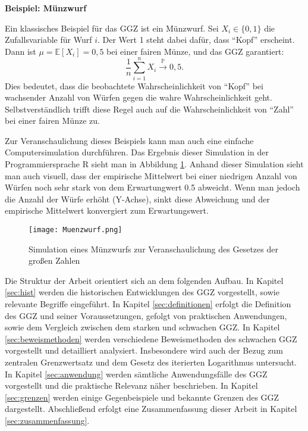 \documentclass[12pt,a4paper]{article}
\begin{document}
\newpage


\textbf{Beispiel: Münzwurf}

Ein klassisches Beispiel für das GGZ ist ein Münzwurf. Sei \( X_i \in \{0,1\} \) die Zufallsvariable für Wurf \( i \). Der Wert 1 steht dabei dafür, dass \enquote{Kopf} erscheint. Dann ist \( \mu = \mathbb{E}[X_i] = 0{,}5 \) bei einer fairen Münze, und das GGZ garantiert:
\[
\frac{1}{n} \sum_{i=1}^n X_i \xrightarrow{\mathbb{P}} 0{,}5.
\]
Dies bedeutet, dass die beobachtete Wahrscheinlichkeit von \enquote{Kopf} bei wachsender Anzahl von Würfen gegen die wahre Wahrscheinlichkeit geht.
Selbstverständlich trifft diese Regel auch auf die Wahrscheinlichkeit von \enquote{Zahl} bei einer fairen Münze zu. 

Zur Veranschaulichung dieses Beispiels kann man auch eine einfache Computersimulation durchführen.
Das Ergebnis dieser Simulation in der Programmiersprache R sieht man in Abbildung \ref{fig:muenzwurf}.
Anhand dieser Simulation sieht man auch visuell, dass der empirische Mittelwert bei einer niedrigen Anzahl von Würfen noch sehr stark von dem Erwartungwert 0.5 abweicht.
Wenn man jedoch die Anzahl der Würfe erhöht (Y-Achse), sinkt diese Abweichung und der empirische Mittelwert konvergiert zum Erwartungswert.


\begin{figure}[h!]
  \centering
  \texttt{[image: Muenzwurf.png]}
  \caption{Simulation eines Münzwurfs zur Veranschaulichung des Gesetzes der großen Zahlen}
  \label{fig:muenzwurf}
\end{figure}

\newpage

Die Struktur der Arbeit orientiert sich an dem folgenden Aufbau.
In Kapitel \ref{sec:hist} werden die historischen Entwicklungen des GGZ vorgestellt, sowie relevante Begriffe eingeführt.
In Kapitel \ref{sec:definitionen} erfolgt die Definition des GGZ und seiner Voraussetzungen, gefolgt von praktischen Anwendungen, sowie dem Vergleich zwischen dem starken und schwachen GGZ.
In Kapitel \ref{sec:beweismethoden} werden verschiedene Beweismethoden des schwachen GGZ vorgestellt und detailliert analysiert. Insbesondere wird auch der Bezug zum zentralen Grenzwertsatz und dem Gesetz des iterierten Logarithmus untersucht.
In Kapitel \ref{sec:anwendung} werden sämtliche Anwendungsfälle des GGZ vorgestellt und die praktische Relevanz näher beschrieben.
In Kapitel \ref{sec:grenzen} werden einige Gegenbeispiele und bekannte Grenzen des GGZ dargestellt. 
Abschließend erfolgt eine Zusammenfassung dieser Arbeit in Kapitel \ref{sec:zusammenfassung}.
\end{document}
